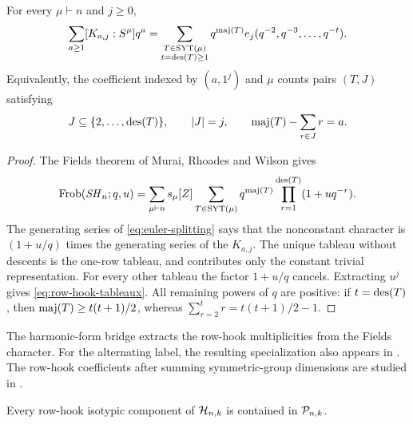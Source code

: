 \begin{theorem}\label{thm:row-hooks}
For every $\mu\vdash n$ and $j\geq0$,
\begin{equation}\label{eq:row-hook-tableaux}
 \sum_{a\geq1}[K_{a,j}:S^\mu]q^a
 =
 \sum_{\substack{T\in\operatorname{SYT}(\mu)\\t=\operatorname{des}(T)\geq1}}
 q^{\operatorname{maj}(T)}e_j(q^{-2},q^{-3},\ldots,q^{-t}).
\end{equation}
Equivalently, the coefficient indexed by $(a,1^j)$ and $\mu$
counts pairs $(T,J)$ satisfying
\[
 J\subseteq\{2,\ldots,\operatorname{des}(T)\},\qquad
 |J|=j,\qquad \operatorname{maj}(T)-\sum_{r\in J}r=a.
\]
\end{theorem}

\begin{proof}
The Fields theorem of Murai, Rhoades and Wilson
\cite[Theorem~5.2 and equation~(2.5)]{MRW} gives
\begin{equation}\label{eq:fields-character}
 \operatorname{Frob}(\mathit{SH}_n;q,u)
 =\sum_{\mu\vdash n}s_\mu[Z]
   \sum_{T\in\operatorname{SYT}(\mu)}
      q^{\operatorname{maj}(T)}
      \prod_{r=1}^{\operatorname{des}(T)}(1+u q^{-r}).
\end{equation}
The generating series of \eqref{eq:euler-splitting} says
that the nonconstant character is $(1+u/q)$ times the
generating series of the $K_{a,j}$.
The unique tableau without descents is the one-row tableau,
and contributes only the constant trivial representation.
For every other tableau the factor $1+u/q$ cancels.
Extracting $u^j$ gives \eqref{eq:row-hook-tableaux}.
All remaining powers of $q$ are positive:
if $t=\operatorname{des}(T)$, then
$\operatorname{maj}(T)\geq t(t+1)/2$, whereas
$\sum_{r=2}^t r=t(t+1)/2-1$.
\end{proof}

The harmonic-form bridge extracts the row-hook multiplicities from
the Fields character.  For the alternating label, the resulting
specialization also
appears in \cite[Corollary~4.6]{Lentfer}.
The row-hook coefficients after summing symmetric-group
dimensions are studied in \cite{CL}.

\begin{proposition}
\label{prop:row-hook-generation}
Every row-hook isotypic component of $\mathcal H_{n,k}$ is
contained in $\mathcal P_{n,k}$.
\end{proposition}

